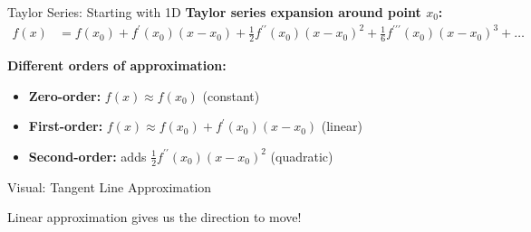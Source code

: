 \documentclass[usenames,dvipsnames]{beamer}
\begin{document}
  \begin{frame}{Taylor Series: Starting with 1D}
    \textbf{Taylor series expansion around point $x_0$:}
    \begin{align}
        f(x) &= f(x_0) + f^{\prime}(x_0)(x-x_0) + \frac{1}{2}f^{\prime\prime}(x_0)(x-x_0)^2 + \frac{1}{6}f^{\prime\prime\prime}(x_0)(x-x_0)^3 + \ldots
    \end{align}
    
    \pause
    \textbf{Different orders of approximation:}
    \begin{itemize}[<+->]
        \item \textbf{Zero-order:} $f(x) \approx f(x_0)$ (constant)
        \item \textbf{First-order:} $f(x) \approx f(x_0) + f^{\prime}(x_0)(x-x_0)$ (linear)
        \item \textbf{Second-order:} adds $\frac{1}{2}f^{\prime\prime}(x_0)(x-x_0)^2$ (quadratic)
    \end{itemize}
  \end{frame}

  \begin{frame}{Visual: Tangent Line Approximation}
    \begin{center}
    \end{center}

    \begin{keypointsbox}{}
    Linear approximation gives us the direction to move!
    \end{keypointsbox}
  \end{frame}
\end{document}
